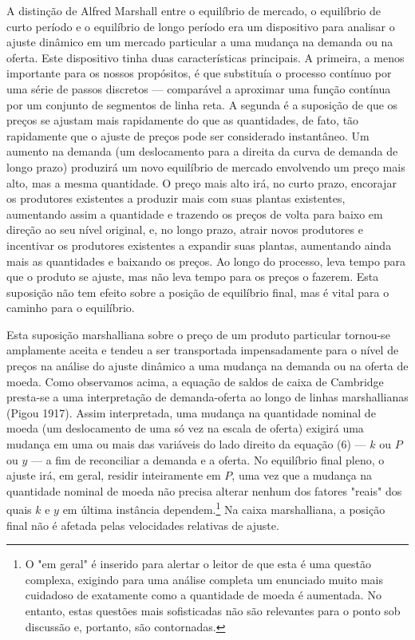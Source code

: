 \documentclass[12pt]{article}
\begin{document}
A distinção de Alfred Marshall entre o equilíbrio de mercado, o equilíbrio de curto período e o equilíbrio de longo período era um dispositivo para analisar o ajuste dinâmico em um mercado particular a uma mudança na demanda ou na oferta. Este dispositivo tinha duas características principais. A primeira, a menos importante para os nossos propósitos, é que substituía o processo contínuo por uma série de passos discretos — comparável a aproximar uma função contínua por um conjunto de segmentos de linha reta. A segunda é a suposição de que os preços se ajustam mais rapidamente do que as quantidades, de fato, tão rapidamente que o ajuste de preços pode ser considerado instantâneo. Um aumento na demanda (um deslocamento para a direita da curva de demanda de longo prazo) produzirá um novo equilíbrio de mercado envolvendo um preço mais alto, mas a mesma quantidade. O preço mais alto irá, no curto prazo, encorajar os produtores existentes a produzir mais com suas plantas existentes, aumentando assim a quantidade e trazendo os preços de volta para baixo em direção ao seu nível original, e, no longo prazo, atrair novos produtores e incentivar os produtores existentes a expandir suas plantas, aumentando ainda mais as quantidades e baixando os preços. Ao longo do processo, leva tempo para que o produto se ajuste, mas não leva tempo para os preços o fazerem. Esta suposição não tem efeito sobre a posição de equilíbrio final, mas é vital para o caminho para o equilíbrio.

Esta suposição marshalliana sobre o preço de um produto particular tornou-se amplamente aceita e tendeu a ser transportada impensadamente para o nível de preços na análise do ajuste dinâmico a uma mudança na demanda ou na oferta de moeda. Como observamos acima, a equação de saldos de caixa de Cambridge presta-se a uma interpretação de demanda-oferta ao longo de linhas marshallianas (Pigou 1917). Assim interpretada, uma mudança na quantidade nominal de moeda (um deslocamento de uma só vez na escala de oferta) exigirá uma mudança em uma ou mais das variáveis do lado direito da equação (6) — $k$ ou $P$ ou $y$ — a fim de reconciliar a demanda e a oferta. No equilíbrio final pleno, o ajuste irá, em geral, residir inteiramente em $P$, uma vez que a mudança na quantidade nominal de moeda não precisa alterar nenhum dos fatores "reais" dos quais $k$ e $y$ em última instância dependem.\footnote{O "em geral" é inserido para alertar o leitor de que esta é uma questão complexa, exigindo para uma análise completa um enunciado muito mais cuidadoso de exatamente como a quantidade de moeda é aumentada. No entanto, estas questões mais sofisticadas não são relevantes para o ponto sob discussão e, portanto, são contornadas.} Na caixa marshalliana, a posição final não é afetada pelas velocidades relativas de ajuste.
\end{document}
